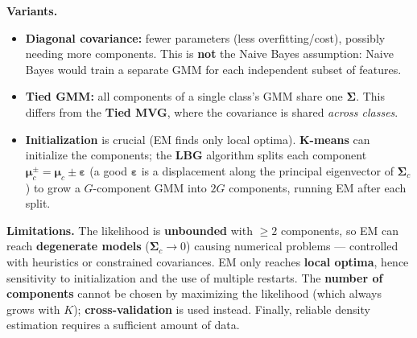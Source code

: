 \textbf{Variants.}
\begin{itemize}
\item \textbf{Diagonal covariance:} fewer parameters (less overfitting/cost), possibly needing more components. This is \textbf{not} the Naive Bayes assumption: Naive Bayes would train a separate GMM for each independent subset of features.
\item \textbf{Tied GMM:} all components of a single class's GMM share one $\boldsymbol{\Sigma}$. This differs from the \textbf{Tied MVG}, where the covariance is shared \textit{across classes}.
\item \textbf{Initialization} is crucial (EM finds only local optima). \textbf{K-means} can initialize the components; the \textbf{LBG} algorithm splits each component $\boldsymbol{\mu}_c^{\pm}=\boldsymbol{\mu}_c\pm\boldsymbol{\varepsilon}$ (a good $\boldsymbol{\varepsilon}$ is a displacement along the principal eigenvector of $\boldsymbol{\Sigma}_c$) to grow a $G$-component GMM into $2G$ components, running EM after each split.
\end{itemize}

\textbf{Limitations.} The likelihood is \textbf{unbounded} with $\ge 2$ components, so EM can reach \textbf{degenerate models} ($\boldsymbol{\Sigma}_c \to 0$) causing numerical problems — controlled with heuristics or constrained covariances. EM only reaches \textbf{local optima}, hence sensitivity to initialization and the use of multiple restarts. The \textbf{number of components} cannot be chosen by maximizing the likelihood (which always grows with $K$); \textbf{cross-validation} is used instead. Finally, reliable density estimation requires a sufficient amount of data.

